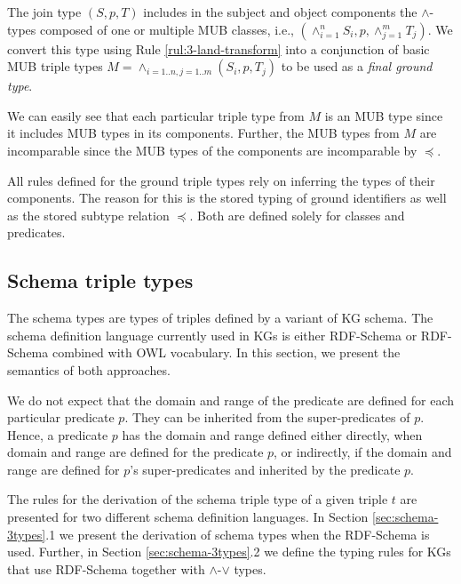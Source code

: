 \documentclass[runningheads]{llncs}
\begin{document}
The join type $(S,p,T)$ includes in the subject and object components
the $\land$-types composed of one or multiple MUB classes, i.e.,
$(\land_{i=1}^{n}S_i,p,\land_{j=1}^{m}T_j)$. We convert this type
using Rule \ref{rul:3-land-transform} into a conjunction of basic MUB
triple types $M=\land_{i=1..n, j=1..m}(S_i,p,T_j)$ to be used as a
\emph{final ground type}.

We can easily see that each particular triple type from $M$ is an MUB
type since it includes MUB types in its components. Further, the MUB
types from $M$ are incomparable since the MUB types of the components
are incomparable by $\preceq$.

All rules defined for the ground triple types rely on inferring the
types of their components. The reason for this is the stored typing
of ground identifiers as well as the stored subtype relation $\preceq$.
Both are defined solely for classes and predicates.





\subsection{Schema triple types\label{sec:schema-3types}}

The schema types are types of triples defined by a variant of KG
schema. The schema definition language currently used in KGs is either
RDF-Schema \cite{rdfschema} or RDF-Schema combined with OWL
\cite{owl2} vocabulary. In this section, we present the semantics of
both approaches.

We do not expect that the domain and range of the predicate are defined
for each particular predicate $p$. They can be inherited from the
super-predicates of $p$. Hence, a predicate $p$ has the domain and
range defined either directly, when domain and range are defined for
the predicate $p$, or indirectly, if the domain and range are defined
for $p$'s super-predicates and inherited by the predicate $p$.

The rules for the derivation of the schema triple type of a given
triple $t$ are presented for two different schema definition
languages. In Section \ref{sec:schema-3types}.1 we present the
derivation of schema types when the RDF-Schema is used. Further, in
Section \ref{sec:schema-3types}.2 we define the typing rules for
KGs that use RDF-Schema together with $\land$-$\lor$ types.
\end{document}
